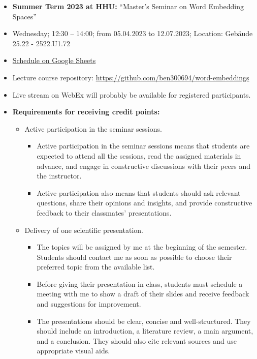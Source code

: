 \documentclass[11pt, a4paper]{amsart}
\begin{document}
\begin{itemize}
    \item \textbf{Summer Term 2023 at HHU:} 
     ``Master's Seminar on Word Embedding Spaces''
    \item Wednesday; 12:30 -- 14:00; from 05.04.2023 to 12.07.2023; Location: Gebäude 25.22 - 2522.U1.72
    \item \href{https://docs.google.com/spreadsheets/d/1V-d-QuJIUniPq9q-Xviu_TdLZHlW_xzBTqhDX_lIG9w/edit?usp=sharing}{Schedule on Google Sheets}
    \item Lecture course repository: \url{https://github.com/ben300694/word-embeddings}
    \item Live stream on WebEx will probably be available for registered participants.
    \item \textbf{Requirements for receiving credit points:}
    \begin{itemize}
        \item Active participation in the seminar sessions. 
        \begin{itemize}
        	\item Active participation in the seminar sessions means that students are expected to attend all the sessions, read the assigned materials in advance, and engage in constructive discussions with their peers and the instructor.
        	\item Active participation also means that students should ask relevant questions, share their opinions and insights, and provide constructive feedback to their classmates’ presentations.
        \end{itemize}
        \item Delivery of one scientific presentation.
        \begin{itemize}
        	\item The topics will be assigned by me at the beginning of the semester.
        	Students should contact me as soon as possible to choose their preferred topic from the available list.
        	\item Before giving their presentation in class, students must schedule a meeting with me to show a draft of their slides and receive feedback and suggestions for improvement.
        	\item The presentations should be clear, concise and well-structured.
        	They should include an introduction, a literature review, a main argument, and a conclusion.
        	They should also cite relevant sources and use appropriate visual aids.

\end{itemize}
\end{itemize}
\end{itemize}
\end{document}
